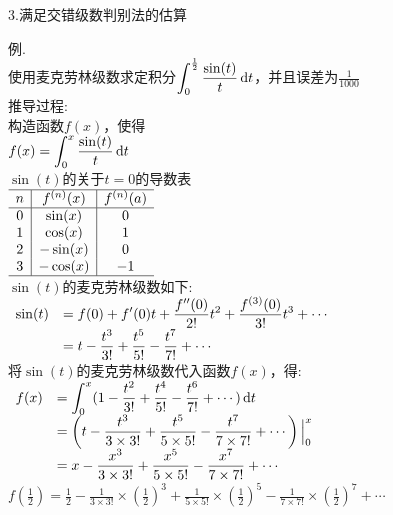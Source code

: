 3.满足交错级数判别法的估算\\
\begin{center}
\end{center}
例.\\
使用麦克劳林级数求定积分$\displaystyle\int_0^{\frac{1}{2}}\frac{\sin(t)}{t}\mathop{}\!\mathrm{d} t$，并且误差为$\displaystyle\frac{1}{1000}$\\
推导过程:\\
构造函数$f(x)$，使得\\
$\displaystyle f(x)=\int_0^x\frac{\sin(t)}{t}\mathop{}\!\mathrm{d} t$\\
$\sin(t)$的关于$t=0$的导数表\\[1ex]
$\begin{array}{c|c|c}
\hline
n & f^{(n)}(x) & f^{(n)}(a)\\
\hline
0 & \sin(x) & 0\\
1 & \cos(x) & 1\\
2 & -\sin(x) & 0\\
3 & -\cos(x) & -1\\
\hline
\end{array}$\\[1ex]
$\sin(t)$的麦克劳林级数如下:\\
$\begin{array}{>{\displaystyle}r >{\displaystyle}l}
\sin(t) & =f(0)+f'(0)t+\frac{f''(0)}{2!}t^2+\frac{f^{(3)}(0)}{3!}t^3+\cdots\\[1ex]
& =t-\frac{t^3}{3!}+\frac{t^5}{5!}-\frac{t^7}{7!}+\cdots
\end{array}$\\[1ex]
将$\sin(t)$的麦克劳林级数代入函数$f(x)$，得:\\
$\begin{array}{>{\displaystyle}r >{\displaystyle}l}
f(x) & =\int_0^x(1-\frac{t^2}{3!}+\frac{t^4}{5!}-\frac{t^6}{7!}+\cdots)\dif t\\[1ex]
& =\left(t-\frac{t^3}{3\times 3!}+\frac{t^5}{5\times 5!}-\frac{t^7}{7\times 7!}+\cdots\right)\Big|_0^x\\[1ex]
& =x-\frac{x^3}{3\times 3!}+\frac{x^5}{5\times 5!}-\frac{x^7}{7\times 7!}+\cdots
\end{array}$\\[1ex]
$\displaystyle f(\frac{1}{2})=\frac{1}{2}-\frac{1}{3\times 3!}\times(\frac{1}{2})^3+\frac{1}{5\times 5!}\times(\frac{1}{2})^5-\frac{1}{7\times 7!}\times(\frac{1}{2})^7+\cdots$\\
